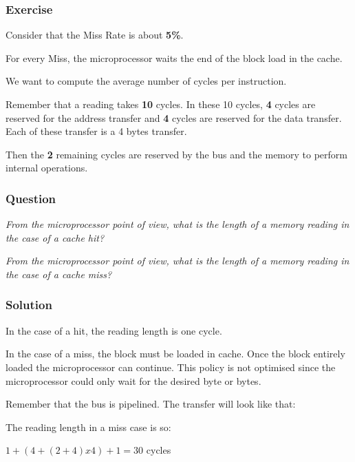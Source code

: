 \begin{frame}
  \frametitle{Exercise}

  Consider that the Miss Rate is about \textbf{5\%}.

  \-

  For every Miss, the microprocessor waits the end of the block
  load in the cache.

  \-

  We want to compute the average number of cycles per instruction.

  \-

  Remember that a reading takes \textbf{10} cycles. In these 10 cycles,
  \textbf{4} cycles are reserved for the address transfer and \textbf{4}
  cycles are reserved for the data transfer. Each of these transfer is
  a 4 bytes transfer.

  \-

  Then the \textbf{2} remaining cycles are reserved by the bus and the memory
  to perform internal operations.
\end{frame}


\begin{frame}
  \frametitle{Question}

  \textit{From the microprocessor point of view, what is the length of
    a memory reading in the case of a cache hit?}

  \-

  \textit{From the microprocessor point of view, what is the length of
    a memory reading in the case of a cache miss?}
\end{frame}


\begin{frame}
  \frametitle{Solution}

  In the case of a hit, the reading length is one cycle.

  \-

  In the case of a miss, the block must be loaded in cache. Once the block
  entirely loaded the microprocessor can continue. This policy is not
  optimised since the microprocessor could only wait for the desired byte
  or bytes.

  \-

  Remember that the bus is pipelined. The transfer will look like that:

  \begin{center}
  \end{center}

  The reading length in a miss case is so:

  \-

  $1 + (4 + (2 + 4) x 4) + 1 = 30$ cycles
\end{frame}


